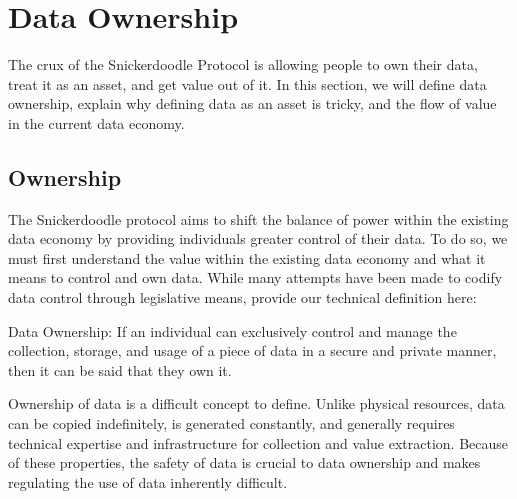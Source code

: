 \section{Data Ownership} 
\label{section:DataOwnership}


The crux of the Snickerdoodle Protocol is allowing people to own their data, treat it as an asset, and get value out of it. In this section, we will define data ownership, explain why defining data as an asset is tricky, and the flow of value in the current data economy.

\subsection{Ownership}


The Snickerdoodle protocol aims to shift the balance of power within the existing data economy by providing individuals greater control of their data. To do so, we must first understand the value within the existing data economy and what it means to control and own data. While many attempts have been made to codify data control through legislative means, provide our technical definition here:
\begin{definition}
\label{definition:DataOwnership}
Data Ownership: If an individual can exclusively control and manage the collection, storage, and usage of a piece of data in a secure and private manner, then it can be said that they own it.
\end{definition}


Ownership of data is a difficult concept to define. Unlike physical resources, data can be copied indefinitely, is generated constantly, and generally requires technical expertise and infrastructure for collection and value extraction. Because of these properties, the safety of data is crucial to data ownership and makes regulating the use of data inherently difficult.

